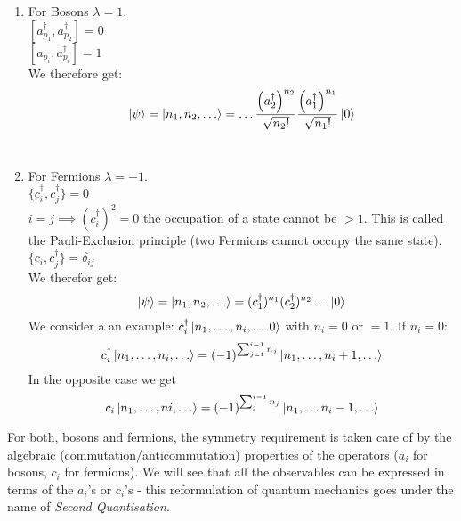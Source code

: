 \documentclass{report}
\begin{document}
\begin{enumerate}
	\item For Bosons $\lambda = 1$. \\
		$[a_{p_1}^\dagger, a_{p_2}^\dagger] = 0$\\
		$[a_{p_i}, a_{p_i}^\dagger] = 1$ \\
		We therefore get:  \[
			\ket{\psi} = \ket{n_1,n_2,\ldots} =\ldots \frac{\left( a_2^\dagger \right)^{n_2} }{\sqrt{n_2!} } \frac{\left( a_1^\dagger \right)^{n_1} }{\sqrt{n_1!} } \ket{0}
		\] \\
	\item For Fermions $\lambda = -1$. \\
		$\{c_i^\dagger, c_j^\dagger\} = 0$ \\
		$i = j \implies (c_i^\dagger)^2 = 0$ the occupation of a state cannot be $> 1$. This is called the Pauli-Exclusion principle (two Fermions cannot occupy the same state). \\
		$\{c_i, c_j^\dagger\} = \delta_{ij}$ \\
		We therefor get: \[
			\ket{\psi } = \ket{n_1, n_2, \ldots} = (c_1^\dagger)^{n_1} (c_2^\dagger)^{n_2} \ldots \ket{0}
		\] We consider a an example: $c_i^\dagger \ket{n_1,\ldots, n_i, \ldots 0}$ with $n_i = 0$ or $= 1$. If $n_i = 0$: \[
		c_i^\dagger \ket{n_1, \ldots, n_i, \ldots} = \left( -1 \right)^{\sum_{j=1}^{i-1} n_j} \ket{n_1, \ldots, n_i + 1, \ldots}
		\] In the opposite case we get \[
		c_i \ket{n_1, \ldots, ni,\ldots} = \left( -1 \right)^{\sum_{j}^{i-1} n_j} \ket{n_1,\ldots n_i-1, \ldots}
		\] 
\end{enumerate}
For both, bosons and fermions, the symmetry requirement is taken care of by the algebraic (commutation/anticommutation) properties of the operators ($a_i$ for bosons, $c_i$ for fermions). We will see that all the observables can be expressed in terms of the $a_i$'s or $c_i$'s - this reformulation of quantum mechanics goes under the name of \emph{Second Quantisation}. \\
\end{document}
